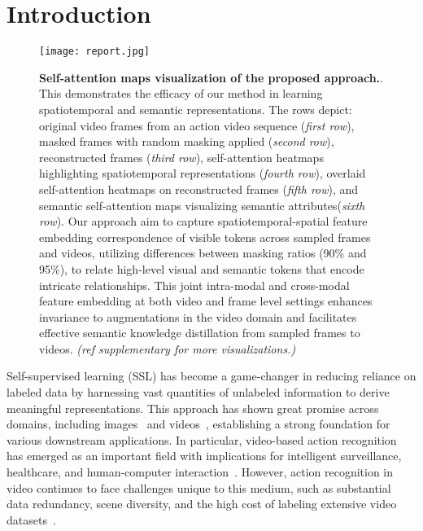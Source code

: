 \vspace{-8pt}
\section{Introduction}
\label{sec:intro}




\begin{figure}[t!]
\centering
\texttt{[image: report.jpg]}
\captionsetup{font=footnotesize}
\caption{\textbf{Self-attention maps visualization of the proposed approach.}. This demonstrates the efficacy of our method in learning spatiotemporal and semantic representations. The rows depict: original video frames from an action video sequence (\textit{first row}), masked frames with random masking applied (\textit{second row}), reconstructed frames (\textit{third row}), self-attention heatmaps highlighting spatiotemporal representations (\textit{fourth row}), overlaid self-attention heatmaps on reconstructed frames (\textit{fifth row}), and semantic self-attention maps visualizing semantic attributes(\textit{sixth row}). Our approach aim to capture spatiotemporal-spatial feature embedding correspondence of visible tokens across sampled frames and videos,  utilizing differences
between masking ratios (90\% and 95\%), to relate high-level visual and semantic tokens that encode intricate relationships. This joint intra-modal and cross-modal feature embedding at both video and frame level settings enhances invariance to augmentations in the video domain and facilitates effective semantic knowledge distillation from sampled frames to videos. \textit{(ref
supplementary for more visualizations.)}}
\label{fig:report}
\vspace{-20pt}
\end{figure}

Self-supervised learning (SSL) has become a game-changer in reducing reliance on labeled data by harnessing vast quantities of unlabeled information to derive meaningful representations. This approach has shown great promise across domains, including images~\cite{caron2021emerging, radford2021learning, morgado2021audio} and videos~\cite{Jwang2020self, gunawardhana2024effective, dave2024unifying}, establishing a strong foundation for various downstream applications. In particular, video-based action recognition has emerged as an important field with implications for intelligent surveillance, healthcare, and human-computer interaction~\cite{tran2015learning, wang2021tdn, wang2018temporal,zhang2021co}. However, action recognition in video continues to face challenges unique to this medium, such as substantial data redundancy, scene diversity, and the high cost of labeling extensive video datasets~\cite{kumar2023large, kim2024fusion}.

